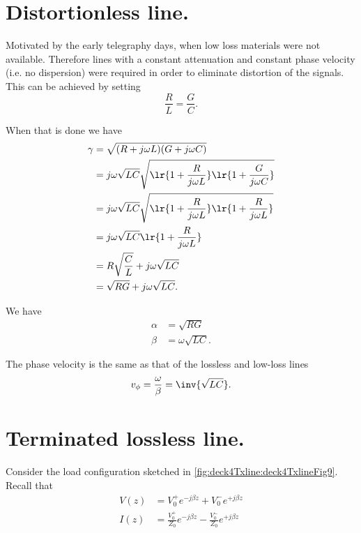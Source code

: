 \section{Distortionless line.}
Motivated by the early telegraphy days, when low loss materials were not available.  Therefore lines with a constant attenuation and constant phase velocity (i.e. no dispersion) were required in order to eliminate distortion of the signals.  This can be achieved by setting
\begin{equation}\label{eqn:uwaves4TransmissionLines:760}
\frac{R}{L} = \frac{G}{C}.
\end{equation}

When that is done we have
\begin{equation}\label{eqn:uwaves4TransmissionLines:780}
\begin{aligned}
\gamma
&= \sqrt{ (R + j \omega L) ( G + j \omega C ) }
\\ &= j \omega \sqrt{L C} \sqrt{
\lr{ 1 + \frac{R}{j \omega L} }
\lr{ 1 + \frac{G}{j \omega C} }
}
\\ &= j \omega \sqrt{L C} \sqrt{
\lr{ 1 + \frac{R}{j \omega L} }
\lr{ 1 + \frac{R}{j \omega L} }
}
\\ &= j \omega \sqrt{L C}
\lr{ 1 + \frac{R}{j \omega L} }
\\ &= R \sqrt{\frac{C}{L} }
+ j \omega \sqrt{L C}
\\ &= \sqrt{R G }
+ j \omega \sqrt{L C}.
\end{aligned}
\end{equation}

We have
\begin{equation}\label{eqn:uwaves4TransmissionLines:800}
\begin{aligned}
\alpha &= \sqrt{R G } \\
\beta &= \omega \sqrt{L C}.
\end{aligned}
\end{equation}

The phase velocity is the same as that of the lossless and low-loss lines
\begin{equation}\label{eqn:uwaves4TransmissionLines:820}
v_\phi = \frac{\omega}{\beta} = \inv{\sqrt{L C}}.
\end{equation}
\section{Terminated lossless line.}
Consider the load configuration sketched in \cref{fig:deck4Txline:deck4TxlineFig9}.
Recall that
\begin{equation}\label{eqn:uwaves4TransmissionLines:840}
\begin{aligned}
V(z) &= V_0^{+} e^{-j \beta z} + V_0^{-} e^{+j \beta z} \\
I(z) &= \frac{V_0^{+}}{Z_0} e^{-j \beta z} - \frac{V_0^{-}}{Z_0} e^{+j \beta z} \\
\end{aligned}
\end{equation}

